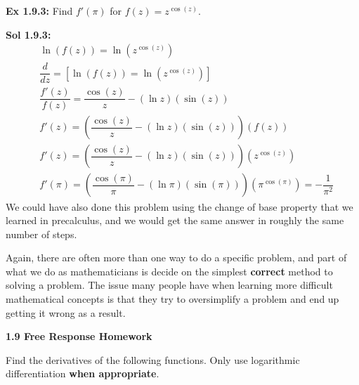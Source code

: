 \begin{tcolorbox}[example]
    \textbf{Ex 1.9.3: } Find $f'(\pi)$ for $f(z) = z^{\cos (z)}$.
\end{tcolorbox}
\begin{tcolorbox}[solution]
    \textbf{Sol 1.9.3: } \begin{align*}
        &\ln (f(z)) = \ln \left(z^{\cos (z)}\right) \\[11pt]
        & \dfrac{d}{dz} = \left[\ln (f(z)) = \ln \left(z^{\cos (z)}\right)\right] \\[11pt]
        & \dfrac{f'(z)}{f(z)} = \dfrac{\cos (z)}{z} - (\ln z)(\sin (z)) \\[11pt]
        & f'(z) = \left(\dfrac{\cos (z)}{z} - (\ln z)(\sin (z))\right)\left(f(z)\right) \\[11pt]
        & f'(z) = \left(\dfrac{\cos (z)}{z} - (\ln z)(\sin (z))\right)\left(z^{\cos (z)}\right) \\[11pt]
        & f'(\pi) = \left(\dfrac{\cos (\pi)}{\pi} - (\ln \pi)(\sin (\pi))\right)\left(\pi^{\cos (\pi)}\right) = \boxed{-\dfrac{1}{\pi^2}}
    \end{align*}
    We could have also done this problem using the change of base property that we learned in precalculus, and we would get the same answer in roughly the same number of steps.
\end{tcolorbox}

Again, there are often more than one way to do a specific problem, and part of what we do as mathematicians is decide on the simplest \textbf{correct} method to solving a problem. The issue many people have when learning more difficult mathematical concepts is that they try to oversimplify a problem and end up getting it wrong as a result. \par

\textbf{\large{1.9 Free Response Homework}} \par

Find the derivatives of the following functions. Only use logarithmic differentiation \textbf{when appropriate}. \par

 \\[11pt]
 \\[11pt]
 \\[11pt]


